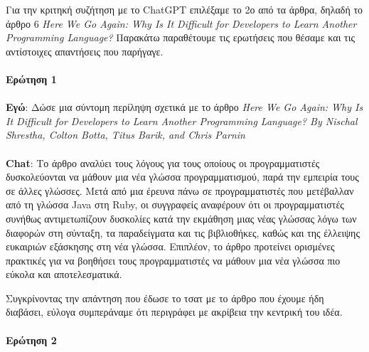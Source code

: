 \documentclass{report}
\begin{document}
Για την κριτηκή συζήτηση με το ChatGPT επιλέξαμε το 2ο από τα άρθρα, δηλαδή το άρθρο 6 \textit{Here We Go Again: Why Is It Difficult for Developers to Learn Another Programming Language? }
Παρακάτω παραθέτουμε τις ερωτήσεις που θέσαμε και τις αντίστοιχες απαντήσεις που παρήγαγε.\\\\
\textbf{Ερώτηση 1}\\\\
\textbf{Εγώ}: Δώσε μια σύντομη περίληψη σχετικά με το άρθρο  \textit{Here We Go Again: Why Is It Difficult for Developers to Learn Another Programming Language? By Nischal Shrestha, Colton Botta, Titus Barik, and Chris Parnin } \\\\
\textbf{Chat}: Το άρθρο αναλύει τους λόγους για τους οποίους οι προγραμματιστές δυσκολεύονται να μάθουν μια νέα γλώσσα προγραμματισμού, παρά την εμπειρία τους σε άλλες γλώσσες. Μετά από μια έρευνα πάνω σε προγραμματιστές που μετέβαλλαν από τη γλώσσα Java στη Ruby, οι συγγραφείς αναφέρουν ότι οι προγραμματιστές συνήθως αντιμετωπίζουν δυσκολίες κατά την εκμάθηση μιας νέας γλώσσας λόγω των διαφορών στη σύνταξη, τα παραδείγματα και τις βιβλιοθήκες, καθώς και της έλλειψης ευκαιριών εξάσκησης στη νέα γλώσσα. Επιπλέον, το άρθρο προτείνει ορισμένες πρακτικές για να βοηθήσει τους προγραμματιστές να μάθουν μια νέα γλώσσα πιο εύκολα και αποτελεσματικά.

Συγκρίνοντας την απάντηση που έδωσε το τσατ με το άρθρο που έχουμε ήδη διαβάσει, εύλογα συμπεράναμε ότι περιγράφει με ακρίβεια την κεντρική του ιδέα.\\\\

\textbf{Ερώτηση 2}\\
\end{document}
